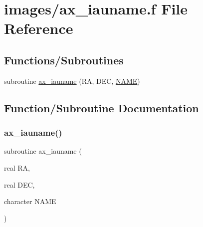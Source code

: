 \hypertarget{ax__iauname_8f}{}\section{images/ax\+\_\+iauname.f File Reference}
\label{ax__iauname_8f}
\subsection*{Functions/\+Subroutines}
\begin{DoxyCompactItemize}
\item 
subroutine \hyperlink{ax__iauname_8f_a6428fa65eee11319f0e61e60855b7a1a}{ax\+\_\+iauname} (RA, D\+EC, \hyperlink{inflate_8h_a164ea0159d5f0b5f12a646f25f99eceaa67bc2ced260a8e43805d2480a785d312}{N\+A\+ME})
\end{DoxyCompactItemize}


\subsection{Function/\+Subroutine Documentation}
\mbox{\label{ax__iauname_8f_a6428fa65eee11319f0e61e60855b7a1a}} 
\subsubsection{\texorpdfstring{ax\+\_\+iauname()}{ax\_iauname()}}
{\footnotesize\ttfamily subroutine ax\+\_\+iauname (\begin{DoxyParamCaption}\item[{real}]{RA,  }\item[{real}]{D\+EC,  }\item[{character}]{N\+A\+ME }\end{DoxyParamCaption})}


